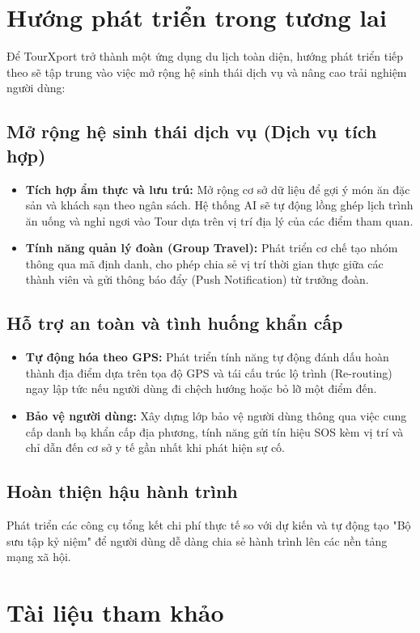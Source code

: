 \section{Hướng phát triển trong tương lai}
Để TourXport trở thành một ứng dụng du lịch toàn diện, hướng phát triển tiếp theo sẽ tập trung vào việc mở rộng hệ sinh thái dịch vụ và nâng cao trải nghiệm người dùng:

\subsection{Mở rộng hệ sinh thái dịch vụ (Dịch vụ tích hợp)}
\begin{itemize}
    \item \textbf{Tích hợp ẩm thực và lưu trú:} Mở rộng cơ sở dữ liệu để gợi ý món ăn đặc sản và khách sạn theo ngân sách. Hệ thống AI sẽ tự động lồng ghép lịch trình ăn uống và nghỉ ngơi vào Tour dựa trên vị trí địa lý của các điểm tham quan.
    \item \textbf{Tính năng quản lý đoàn (Group Travel):} Phát triển cơ chế tạo nhóm thông qua mã định danh, cho phép chia sẻ vị trí thời gian thực giữa các thành viên và gửi thông báo đẩy (Push Notification) từ trưởng đoàn.
\end{itemize}

\subsection{Hỗ trợ an toàn và tình huống khẩn cấp}
\begin{itemize}
    \item \textbf{Tự động hóa theo GPS:} Phát triển tính năng tự động đánh dấu hoàn thành địa điểm dựa trên tọa độ GPS và tái cấu trúc lộ trình (Re-routing) ngay lập tức nếu người dùng đi chệch hướng hoặc bỏ lỡ một điểm đến.
    \item \textbf{Bảo vệ người dùng:} Xây dựng lớp bảo vệ người dùng thông qua việc cung cấp danh bạ khẩn cấp địa phương, tính năng gửi tín hiệu SOS kèm vị trí và chỉ dẫn đến cơ sở y tế gần nhất khi phát hiện sự cố.
\end{itemize}

\subsection{Hoàn thiện hậu hành trình}
\quad Phát triển các công cụ tổng kết chi phí thực tế so với dự kiến và tự động tạo "Bộ sưu tập kỷ niệm" để người dùng dễ dàng chia sẻ hành trình lên các nền tảng mạng xã hội.

\section{Tài liệu tham khảo}
\nocite{*}

